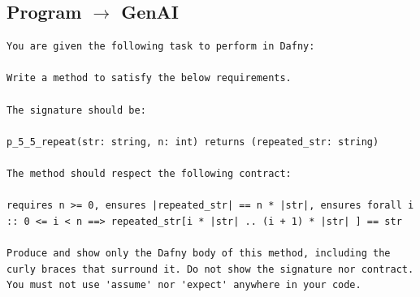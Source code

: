 \documentclass{article}
\begin{document}
\subsection*{Program $\rightarrow$ GenAI}
\begin{lstlisting}
You are given the following task to perform in Dafny:

Write a method to satisfy the below requirements.

The signature should be:

p_5_5_repeat(str: string, n: int) returns (repeated_str: string)

The method should respect the following contract:

requires n >= 0, ensures |repeated_str| == n * |str|, ensures forall i :: 0 <= i < n ==> repeated_str[i * |str| .. (i + 1) * |str| ] == str

Produce and show only the Dafny body of this method, including the curly braces that surround it. Do not show the signature nor contract. You must not use 'assume' nor 'expect' anywhere in your code.
\end{lstlisting}
\end{document}
